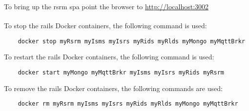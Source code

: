 To bring up the  \gls{rsrm} \gls{spa} point the browser to \href{http://localhost:3002}{http://localhost:3002}\\
\\
To stop the \gls{rails} Docker containers, the following command is used:
\begin{verbatim}  
    docker stop myRsrm myIsms myIsrs myRids myRlds myMongo myMqttBrkr
\end{verbatim}

To restart the \gls{rails} Docker containers, the following command is used:
\begin{verbatim}
    docker start myMongo myMqttBrkr myIsms myIsrs myRids myRsrm
\end{verbatim}

To remove the \gls{rails} Docker containers, the following commands are used:
\begin{verbatim}
    docker rm myRsrm myIsms myIsrs myRids myRlds myMongo myMqttBrkr
\end{verbatim}

